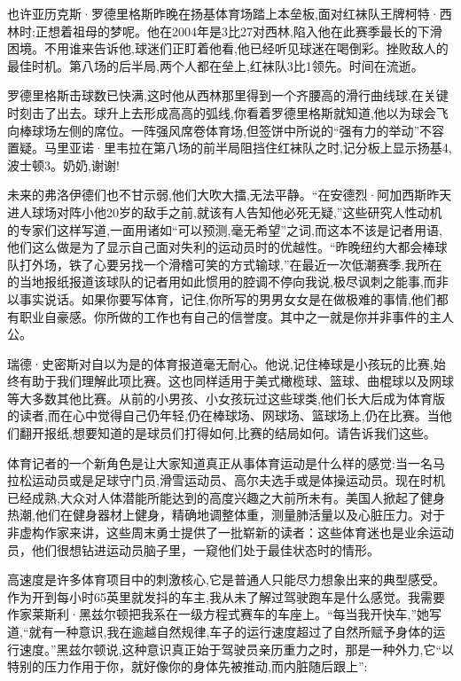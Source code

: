 也许亚历克斯·罗德里格斯昨晚在扬基体育场踏上本垒板,面对红袜队王牌柯特·西林时;正想着祖母的梦呢。他在2004年是3比27对西林,陷入他在此赛季最长的下滑困境。不用谁来告诉他,球迷们正盯着他看,他已经听见球迷在喝倒彩。挫败敌人的最佳时机。第八场的后半局,两个人都在垒上,红袜队3比1领先。时间在流逝。

罗德里格斯击球数已快满,这时他从西林那里得到一个齐腰高的滑行曲线球,在关键时刻击了出去。球升上去形成高高的弧线,你看着罗德里格斯就知道,他以为球会飞向棒球场左侧的席位。一阵强风席卷体育场,但签饼中所说的“强有力的举动”不容置疑。马里亚诺·里韦拉在第八场的前半局阻挡住红袜队之时,记分板上显示扬基4,波士顿3。奶奶,谢谢!

未来的弗洛伊德们也不甘示弱,他们大吹大擂,无法平静。“在安德烈·阿加西斯昨天进人球场对阵小他20岁的敌手之前,就该有人告知他必死无疑,”这些研究人性动机的专家们这样写道,一面用诸如“可以预测,毫无希望”之词,而这本不该是记者用语,他们这么做是为了显示自己面对失利的运动员时的优越性。“昨晚纽约大都会棒球队打外场，铁了心要另找一个滑稽可笑的方式输球,”在最近一次低潮赛季,我所在的当地报纸报道该球队的记者用如此惯用的腔调不停向我说,极尽讽刺之能事,而非以事实说话。如果你要写体育，记住,你所写的男男女女是在做极难的事情,他们都有职业自豪感。你所做的工作也有自己的信誉度。其中之一就是你并非事件的主人公。


瑞德·史密斯对自以为是的体育报道毫无耐心。他说,记住棒球是小孩玩的比赛,始终有助于我们理解此项比赛。这也同样适用于美式橄榄球、篮球、曲棍球以及网球等大多数其他比赛。从前的小男孩、小女孩玩过这些球类,他们长大后成为体育版的读者,而在心中觉得自己仍年轻,仍在棒球场、网球场、篮球场上,仍在比赛。当他们翻开报纸,想要知道的是球员们打得如何,比赛的结局如何。请告诉我们这些。

体育记者的一个新角色是让大家知道真正从事体育运动是什么样的感觉:当一名马拉松运动员或是足球守门员,滑雪运动员、高尔夫选手或是体操运动员。现在时机已经成熟,大众对人体潜能所能达到的高度兴趣之大前所未有。美国人掀起了健身热潮,他们在健身器材上健身，精确地调整体重，测量肺活量以及心脏压力。对于非虚构作家来讲，这些周末勇士提供了一批崭新的读者：这些体育迷也是业余运动员，他们很想钻进运动员脑子里，一窥他们处于最佳状态时的情形。


高速度是许多体育项目中的刺激核心,它是普通人只能尽力想象出来的典型感受。作为开到每小时65英里就发抖的车主,我从未了解过驾驶跑车是什么感觉。我需要作家莱斯利·黑兹尔顿把我系在一级方程式赛车的车座上。“每当我开快车,”她写道,“就有一种意识,我在逾越自然规律,车子的运行速度超过了自然所赋予身体的运行速度。”黑兹尔顿说,这种意识真正始于驾驶员亲历重力之时，那是一种外力,它“以特别的压力作用于你，就好像你的身体先被推动,而内脏随后跟上”:

